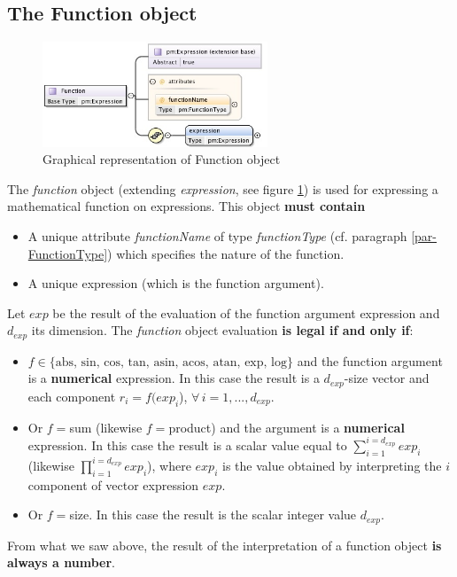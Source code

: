 \documentclass[a4paper,11pt] {ivoa}
\begin{document}
\subsection{The Function object}\label{par02_05}
\begin{figure}[htbp]
\begin{center}
\includegraphics[width=0.6\textwidth]{pictures/Function.jpg} 
\caption{Graphical representation of Function object}
\label{Pic-Function}
\end{center}
\end{figure}
The {\it function} object (extending {\it expression}, see figure \ref{Pic-Function}) is used for
expressing a mathematical function on expressions.
This object {\bf must contain} 
\begin{itemize}
\item A unique attribute {\it functionName} of type {\it functionType} (cf. paragraph
\ref{par-FunctionType}) which specifies the nature of the function.
\item A unique expression (which is the function argument).\\
\end{itemize}
Let $exp$ be the result of the evaluation of the function argument expression and  $d_{exp}$ its
dimension.
The {\it function} object evaluation {\bf is legal if and only if}:
\begin{itemize}
\item $f  \in \{ \mbox{abs, sin, cos, tan, asin, acos, atan, exp, log} \}$ and the function argument
is a {\bf numerical} expression. In this case the  result  is a $d_{exp}$-size vector and each
component  $r_i = f(exp_i$), $\forall \, i=1,...,d_{exp}$.
\item Or $f=$sum (likewise $f=$product) and the argument is a {\bf numerical} expression. In this
case the result is a scalar value equal to $\sum_{i=1}^{i=d_{exp}} exp_i$ (likewise $\prod
_{i=1}^{i=d_{exp}} exp_i$), where $exp_i$ is the value obtained
by interpreting the $i$ component of vector expression $exp$.
\item Or $f=$size. In this case the result is the scalar integer value $d_{exp}$. 
\end{itemize}
From what we saw above, the result of the interpretation of a function object { \bf is always a number}.
\end{document}
